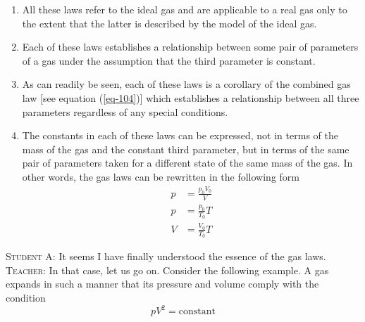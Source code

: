 \documentclass[a4paper,sfsidenotes]{tufte-book}
\begin{document}
\begin{enumerate}
\item All these laws refer to the ideal gas and are applicable to a real gas only to the extent that the latter is described by the model of the ideal gas.
\item Each of these laws establishes a relationship between some pair of parameters of a gas under the assumption that the third parameter is constant.
\item As can readily be seen, each of these laws is a corollary of the combined gas law [see equation (\ref{eq-104})] which establishes a relationship between all three parameters regardless of any special conditions.
\item The constants in each of these laws can be expressed, not in terms of the mass of the gas and the constant third parameter, but in terms of the same pair of parameters taken for a different state of the same mass of the gas. In other words, the gas laws can be rewritten in the following form
\begin{align}
p & = \frac{p_{0}V_{0}}{V}
\tag{107a}
\label{107a}
\\
p & = \frac{p_{0}}{T_{0}} T
\tag{108a}
\label{108a}
\\
V & = \frac{V_{0}}{T_{0}} T
\tag{109a}
\label{109a}
\end{align}

\end{enumerate}
\textsc{Student A:} It seems I have finally understood the essence of the gas laws.
\\
\textsc{Teacher:} In that case, let us go on. Consider the following example. A gas expands in such a manner that its pressure and volume comply with the condition
\begin{equation}
pV^{2} = \text{constant}
\label{eq-110}
\end{equation}
\end{document}
